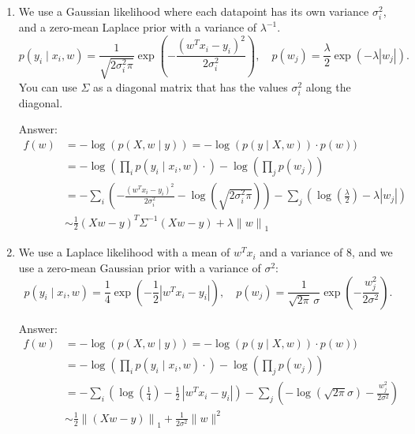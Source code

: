 \documentclass{article}
\newenvironment{answer}{\par\begingroup\color{gre}Answer: }{\endgroup}
\newcommand{\norm}[1]{\lVert #1 \rVert}
\begin{document}
\begin{enumerate}

\item We use a Gaussian likelihood where each datapoint has its own variance $\sigma_i^2$, and a zero-mean Laplace prior with a variance of $\lambda^{-1}$.
\[
p(y_i \mid x_i,w) = \frac{1}{\sqrt{2\sigma_i^2\pi}}\exp\left(-\frac{(w^Tx_i - y_i)^2}{2\sigma_i^2}\right), \quad p(w_j) = \frac{\lambda}{2}\exp(-\lambda|w_j|).
\]
You can use $\Sigma$ as a diagonal matrix that has the values $\sigma_i^2$ along the diagonal.

\begin{answer}
    \begin{align*}
            f(w) &= - \log(p(X, w \mid y)) = -\log(p(y\mid X, w)) \cdot p(w))\\
            &= -\log\left(\prod_i p(y_i\mid x_i, w)\cdot\right) - \log\left(\prod_j p(w_j)\right)\\
            &= -\sum_i \left( -\frac{(w^Tx_i - y_i)^2}{2\sigma_i^2} - \log\left(\sqrt{2\sigma_i^2\pi}\right) \right) - \sum_j \left( \log(\frac{\lambda}{2}) - \lambda |w_j| \right)\\
            &\sim \frac{1}{2} (Xw - y)^T \Sigma^{-1} (Xw - y) + \lambda {\norm{w}}_1
    \end{align*}
\end{answer}

\item We use a Laplace likelihood with a mean of $w^Tx_i$ and a variance of $8$, and we use a zero-mean Gaussian prior with a variance of $\sigma^2$:
\[
p(y_i \mid x_i, w) = \frac14 \exp\left(- \frac12 |w^Tx_i - y_i| \right), \quad
p(w_j) = \frac{1}{\sqrt{2\pi} \, \sigma} \exp\left(-\frac{w_j^2}{2\sigma^2} \right).
\]

\begin{answer}
    \begin{align*}
        f(w) &= - \log(p(X, w \mid y)) = -\log(p(y\mid X, w)) \cdot p(w))\\
            &= -\log\left(\prod_i p(y_i\mid x_i, w)\cdot\right) - \log\left(\prod_j p(w_j)\right)\\
            &= -\sum_i \left(\log\left(\frac14\right)- \frac12\, |w^Tx_i - y_i| \right) - \sum_j \left( -\log(\sqrt{2\pi}\sigma) - \frac{w_j^2}{2\sigma^2} \right)\\
            &\sim \frac{1}{2} {\norm{(Xw - y)}}_1 + \frac{1}{2\sigma^2}\norm{w}^2
    \end{align*}
\end{answer}



\end{enumerate}
\end{document}
